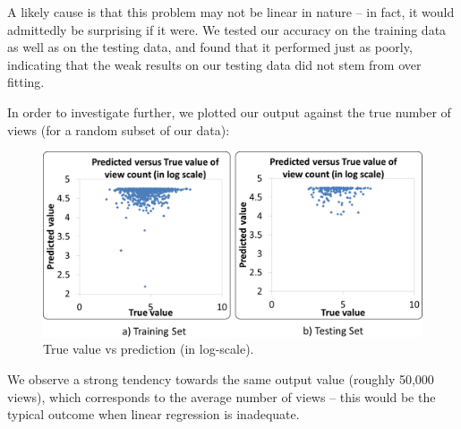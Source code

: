 	A likely cause is that this problem may not be linear in nature -- in fact, it would admittedly be surprising if it were.  We tested our accuracy on the training data as well as on the testing data, and found that it performed just as poorly, indicating that the weak results on our testing data did not stem from over fitting.
	
	In order to investigate further, we plotted our output against the true number of views (for a random subset of our data):

	\begin{figure}[!h]
		\begin{center}
			\includegraphics[width=.75\textwidth,clip]{regression.pdf}
		\end{center}
		\caption{True value vs prediction (in log-scale).}
		\label{fig:trainingTrueVsPredicted}
	\end{figure}
		
	We observe a strong tendency towards the same output value (roughly 50,000 views), which corresponds to the average number of views -- this would be the typical outcome when linear regression is inadequate.
